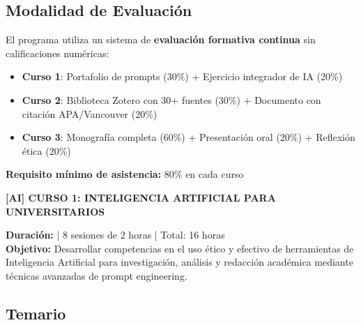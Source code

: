 \documentclass[12pt,a4paper]{yaac-luatex}
\newcommand{\faRobot}{[AI]}
\newcommand{\cursotitulo}[2]{
	\vspace{0.5cm}
	\begin{tcolorbox}[
		enhanced,
		colback=#1,
		colframe=#1,
		arc=5pt,
		boxrule=0pt,
		left=12pt,
		right=12pt,
		top=10pt,
		bottom=10pt
		]
		{\color{white}\Large\bfseries #2}
	\end{tcolorbox}
}
\begin{document}
	\subsection*{Modalidad de Evaluación}
	
	El programa utiliza un sistema de \textbf{evaluación formativa continua} sin calificaciones numéricas:
	
	\begin{itemize}[leftmargin=*, itemsep=0.2cm]
		\item \textbf{Curso 1}: Portafolio de prompts (30\%) + Ejercicio integrador de IA (20\%)
		\item \textbf{Curso 2}: Biblioteca Zotero con 30+ fuentes (30\%) + Documento con citación APA/Vancouver (20\%)
		\item \textbf{Curso 3}: Monografía completa (60\%) + Presentación oral (20\%) + Reflexión ética (20\%)
	\end{itemize}
	
	\textbf{Requisito mínimo de asistencia:} 80\% en cada curso
	
	\newpage
	
	
	\cursotitulo{curso1color}{\faRobot \hspace{0.5em} CURSO 1: INTELIGENCIA ARTIFICIAL PARA UNIVERSITARIOS}
	
	\vspace{0.3cm}
	
	\begin{tcolorbox}[
		enhanced,
		colback=white,
		colframe=curso1color,
		arc=3pt,
		boxrule=2pt,
		breakable
		]
		\textbf{Duración:} | 8 sesiones de 2 horas | Total: 16 horas\\[0.2cm]
		\textbf{Objetivo:} Desarrollar competencias en el uso ético y efectivo de herramientas de Inteligencia Artificial para investigación, análisis y redacción académica mediante técnicas avanzadas de prompt engineering.
	\end{tcolorbox}
	
	\subsection*{Temario}
	
\end{document}
